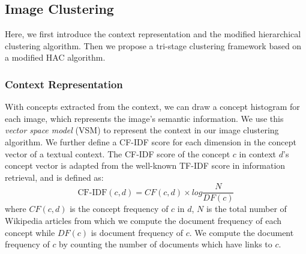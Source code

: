 




\subsection{Image Clustering}
Here, we first introduce the context representation and the modified
hierarchical clustering algorithm. Then we propose
a tri-stage clustering framework based on a modified HAC algorithm.

\subsubsection{Context Representation}
With concepts extracted from the context, we can draw a
concept histogram for each image, which represents the image's semantic
information. We use this \emph{vector space model} (VSM) to represent the
context in our image clustering algorithm. We further define a CF-IDF score
for each dimension in the concept vector of a textual context. The
CF-IDF score of the concept $c$ in context $d$'s concept vector
is adapted from the well-known TF-IDF score in information retrieval,
and is defined as:
\begin{equation}
\label{cfidf}
\mbox{CF-IDF}(c, d)= CF(c, d) \times log\frac{N}{DF(c)}
\end{equation}
where $CF(c,d)$ is the concept frequency of $c$ in $d$, $N$ is the
total number of Wikipedia articles from which we compute the document frequency
of each concept %
while $DF(c)$ is document frequency of $c$. We compute the document
frequency of $c$ by counting the number of documents which have links
to $c$.

